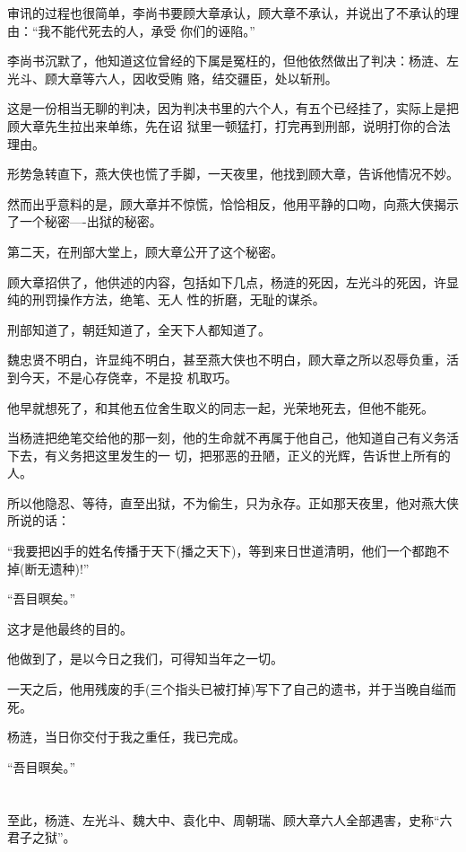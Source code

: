 \documentclass[11pt,a4paper,onecolumn]{article}
\begin{document}
审讯的过程也很简单，李尚书要顾大章承认，顾大章不承认，并说出了不承认的理由：``我不能代死去的人，承受
你们的诬陷。''

李尚书沉默了，他知道这位曾经的下属是冤枉的，但他依然做出了判决：杨涟、左光斗、顾大章等六人，因收受贿
赂，结交疆臣，处以斩刑。

这是一份相当无聊的判决，因为判决书里的六个人，有五个已经挂了，实际上是把顾大章先生拉出来单练，先在诏
狱里一顿猛打，打完再到刑部，说明打你的合法理由。

形势急转直下，燕大侠也慌了手脚，一天夜里，他找到顾大章，告诉他情况不妙。

然而出乎意料的是，顾大章并不惊慌，恰恰相反，他用平静的口吻，向燕大侠揭示了一个秘密----出狱的秘密。

第二天，在刑部大堂上，顾大章公开了这个秘密。

顾大章招供了，他供述的内容，包括如下几点，杨涟的死因，左光斗的死因，许显纯的刑罚操作方法，绝笔、无人
性的折磨，无耻的谋杀。

刑部知道了，朝廷知道了，全天下人都知道了。

魏忠贤不明白，许显纯不明白，甚至燕大侠也不明白，顾大章之所以忍辱负重，活到今天，不是心存侥幸，不是投
机取巧。

他早就想死了，和其他五位舍生取义的同志一起，光荣地死去，但他不能死。

当杨涟把绝笔交给他的那一刻，他的生命就不再属于他自己，他知道自己有义务活下去，有义务把这里发生的一
切，把邪恶的丑陋，正义的光辉，告诉世上所有的人。

所以他隐忍、等待，直至出狱，不为偷生，只为永存。正如那天夜里，他对燕大侠所说的话：

``我要把凶手的姓名传播于天下(播之天下)，等到来日世道清明，他们一个都跑不掉(断无遗种)!''

``吾目暝矣。''

这才是他最终的目的。

他做到了，是以今日之我们，可得知当年之一切。

一天之后，他用残废的手(三个指头已被打掉)写下了自己的遗书，并于当晚自缢而死。

杨涟，当日你交付于我之重任，我已完成。

``吾目暝矣。''

\section[\thesection]{}

至此，杨涟、左光斗、魏大中、袁化中、周朝瑞、顾大章六人全部遇害，史称``六君子之狱''。
\end{document}
